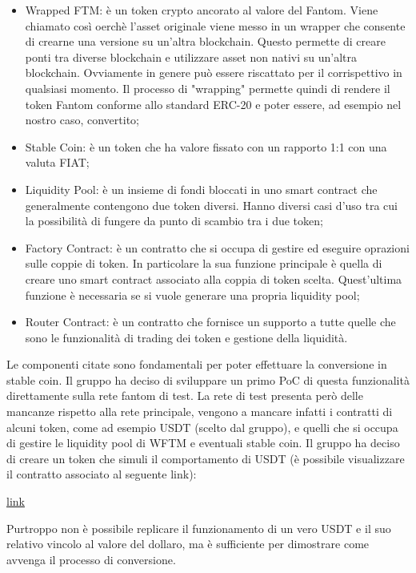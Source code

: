 \begin{itemize}
    \item Wrapped FTM: è un token crypto ancorato al valore del Fantom. Viene chiamato così oerchè l'asset originale viene messo in un wrapper che consente di crearne una versione su un'altra blockchain. Questo permette di creare ponti tra diverse blockchain e utilizzare asset non nativi su  un'altra blockchain. Ovviamente in genere può essere riscattato per il corrispettivo in qualsiasi momento. Il processo di "wrapping" permette quindi di rendere il token Fantom conforme allo standard ERC-20 e poter essere, ad esempio nel nostro caso, convertito;
    \item Stable Coin: è un token che ha valore fissato con un rapporto 1:1 con una valuta FIAT\glo{};
    \item Liquidity Pool: è un insieme di fondi bloccati in uno smart contract che generalmente contengono due token diversi. Hanno diversi casi d'uso tra cui la possibilità di fungere da punto di scambio tra i due token;
    \item Factory Contract: è un contratto che si occupa di gestire ed eseguire oprazioni sulle coppie di token. In particolare la sua funzione principale è quella di creare uno smart contract associato alla coppia di token scelta. Quest'ultima funzione è necessaria se si vuole generare una propria liquidity pool;
    \item Router Contract: è un contratto che fornisce un supporto a tutte quelle che sono le funzionalità di trading dei token e gestione della liquidità.
\end{itemize}

Le componenti citate sono fondamentali per poter effettuare la conversione in stable coin. 
Il gruppo ha deciso di sviluppare un primo PoC di questa funzionalità direttamente sulla rete fantom di test. La rete di test presenta però delle mancanze rispetto alla rete principale, vengono a mancare infatti i contratti di alcuni token, come ad esempio USDT (scelto dal gruppo), e quelli che si occupa di gestire le liquidity pool di WFTM e eventuali stable coin.
Il gruppo ha deciso di creare un token che simuli il comportamento di USDT (è possibile visualizzare il contratto associato al seguente link):

\href{}{link}

Purtroppo non è possibile replicare il funzionamento di un vero USDT e il suo relativo vincolo al valore del dollaro, ma è sufficiente per dimostrare come avvenga il processo di conversione.\\

